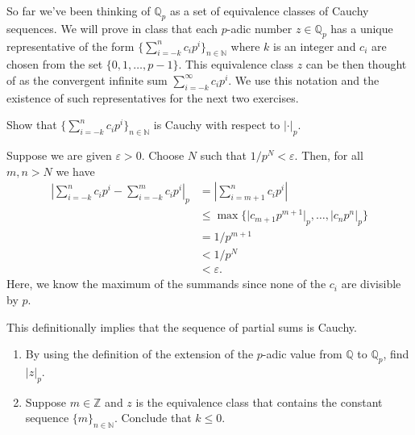 \documentclass[12 pt, letterpaper]{hmcpset}
\begin{document}
So far we've been thinking of $\mathbb{Q}_{p}$ as a set of equivalence classes of Cauchy sequences. We will prove in class that each $p$-adic number $z \in \mathbb{Q}_{p}$ has a unique representative of the form $\{ \sum_{i = -k}^{n} c_{i} p^{i} \}_{n \in \mathbb{N}}$ where $k$ is an integer and $c_{i}$ are chosen from the set $\{ 0, 1, \dots, p - 1 \}$. This equivalence class $z$ can be then thought of as the convergent infinite sum $\sum_{i = -k}^{\infty} c_{i} p^{i}$. We use this notation and the existence of such representatives for the next two exercises.

\begin{problem}[(3)]
	Show that $\{ \sum_{i = -k}^{n} c_{i} p^{i} \}_{n \in \mathbb{N}}$ is Cauchy with respect to $\lvert \cdot \rvert_{p}$.
\end{problem}

\begin{solution}
	Suppose we are given $\varepsilon > 0$. Choose $N$ such that $1 / p^{N} < \varepsilon$. Then, for all $m, n > N$ we have
	\begin{align*}
		\left \lvert \sum_{i = -k}^{n} c_{i} p^{i} - \sum_{i = -k}^{m} c_{i} p^{i} \right \rvert_{p} & = \left \lvert \sum_{i = m + 1}^{n} c_{i} p^{i} \right \rvert \\
													     & \le \max \{ \lvert c_{m + 1} p^{m + 1} \rvert_{p}, \dots, \lvert c_{n} p^{n} \rvert_{p} \} \\
													     & = 1 / p^{m + 1} \\
													     & < 1 / p^{N} \\
													     & < \varepsilon.
	\end{align*}
	Here, we know the maximum of the summands since none of the $c_{i}$ are divisible by $p$.

	This definitionally implies that the sequence of partial sums is Cauchy.
\end{solution}

\pagebreak

\begin{problem}[(4)]
	\begin{enumerate}
		\item By using the definition of the extension of the  $p$-adic value from $\mathbb{Q}$ to $\mathbb{Q}_{p}$, find $\lvert z \rvert_{p}$.

		\item Suppose $m \in \mathbb{Z}$ and $z$ is the equivalence class that contains the constant sequence $\{ m \}_{n \in \mathbb{N}}$. Conclude that $k \le 0$.
	\end{enumerate}
\end{problem}
\end{document}
